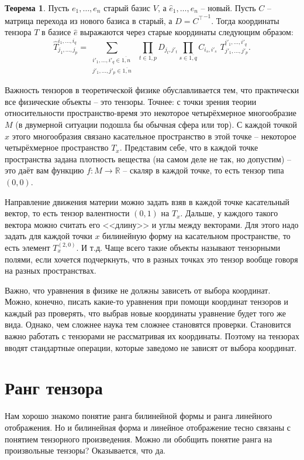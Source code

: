 \documentclass[12pt,a4paper,oneside]{book}
\theoremstyle{definition}
\newtheorem{thm}{\color{red!40!black}Теорема}
\newcommand{\ovl}{\overline}
\newcommand{\R}{\mathbb R}
\def\thrm{\begin{thm}}
\def\ethrm{\end{thm}}
\begin{document}
\thrm Пусть $e_1,\dots,e_n$ старый базис $V$, а $\hat{e}_1,\dots,\hat{e}_n$ -- новый. Пусть $C$ -- матрица перехода из нового базиса в старый, а $D={C^{\top}}^{-1}$. Тогда координаты тензора $T$ в базисе $\hat{e}$ выражаются через старые координаты следующим образом:
$$\hat{T}_{j_1,\dots,j_p}^{i_1,\dots,i_q}=\sum_{\substack{i'_1,\dots,i'_q \in \ovl{1,n}\\ j'_1,\dots,j'_p \in \ovl{1,n}}} \,\,
\prod_{t\in \ovl{1,p}} D_{j_t,j'_t} \prod_{s\in \ovl{1,q}} C_{i_s,i'_s}  \,\,T_{j'_1,\dots,j'_p}^{i'_1,\dots,i'_q}.$$
\ethrm

Важность тензоров в теоретической физике обуславливается тем, что практически все физические объекты -- это тензоры. Точнее: с точки зрения теории относительности пространство-время это некоторое четырёхмерное многообразие $M$ (в двумерной ситуации подошла бы обычная сфера или тор). С каждой точкой $x$ этого многообразия связано касательное пространство в этой точке -- некоторое четырёхмерное пространство $T_x$. Представим себе, что в каждой точке пространства задана плотность вещества (на самом деле не так, но допустим) -- это даёт вам функцию $f \colon M \to \R$ -- скаляр в каждой точке, то есть тензор типа $(0,0)$. 

Направление движения материи можно задать взяв в каждой точке касательный вектор, то есть тензор валентности $(0,1)$ на $T_x$. Дальше, у каждого такого вектора можно считать его <<длину>> и углы между векторами. Для этого надо задать для каждой точки $x$ билинейную форму на касательном пространстве, то есть элемент $T_x^{(2,0)}$. И т.д. Чаще всего такие объекты называют тензорными полями, если хочется подчеркнуть, что в разных точках это тензор вообще говоря на разных пространствах.

Важно, что уравнения в физике не должны зависеть от выбора координат. Можно, конечно, писать какие-то уравнения при помощи координат тензоров и каждый раз проверять, что выбрав новые координаты уравнение будет того же вида. Однако, чем сложнее наука тем сложнее становятся проверки. Становится важно работать с тензорами не рассматривая их координаты. Поэтому на тензорах вводят стандартные операции, которые заведомо не зависят от выбора координат.


\section{Ранг тензора}

Нам хорошо знакомо понятие ранга билинейной формы и ранга линейного отображения. Но и билинейная форма и линейное отображение тесно связаны с понятием тензорного произведения. Можно ли обобщить понятие ранга на произвольные тензоры? Оказывается, что да. 
\end{document}
